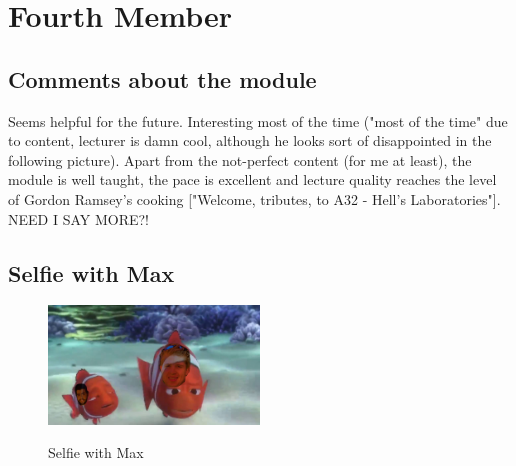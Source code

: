 \section{Fourth Member}


\subsection{Comments about the module}
Seems helpful for the future. Interesting most of the time ("most of the time" due to content, lecturer is damn cool, although he looks sort of disappointed in the following picture). Apart from the not-perfect content (for me at least), the module is well taught, the pace is excellent and lecture quality reaches the level of Gordon Ramsey's cooking ["Welcome, tributes, to A32 - Hell's Laboratories"]. NEED I SAY MORE?!

\subsection{Selfie with Max}

\begin{figure}[h]
\caption{Selfie with Max}
\centering
\includegraphics[width=0.5\textwidth]{../images/nemo.jpg}
\label{fig:selfie4}
\end{figure}

